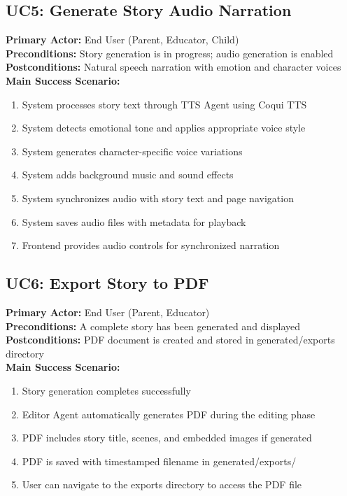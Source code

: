 \subsection{UC5: Generate Story Audio Narration}
\textbf{Primary Actor:} End User (Parent, Educator, Child)\\
\textbf{Preconditions:} Story generation is in progress; audio generation is enabled\\
\textbf{Postconditions:} Natural speech narration with emotion and character voices\\
\textbf{Main Success Scenario:}
\begin{enumerate}
    \item System processes story text through TTS Agent using Coqui TTS
    \item System detects emotional tone and applies appropriate voice style
    \item System generates character-specific voice variations
    \item System adds background music and sound effects
    \item System synchronizes audio with story text and page navigation
    \item System saves audio files with metadata for playback
    \item Frontend provides audio controls for synchronized narration
\end{enumerate}

\subsection{UC6: Export Story to PDF}
\textbf{Primary Actor:} End User (Parent, Educator)\\
\textbf{Preconditions:} A complete story has been generated and displayed\\
\textbf{Postconditions:} PDF document is created and stored in generated/exports directory\\
\textbf{Main Success Scenario:}
\begin{enumerate}
    \item Story generation completes successfully
    \item Editor Agent automatically generates PDF during the editing phase
    \item PDF includes story title, scenes, and embedded images if generated
    \item PDF is saved with timestamped filename in generated/exports/
    \item User can navigate to the exports directory to access the PDF file
\end{enumerate}

